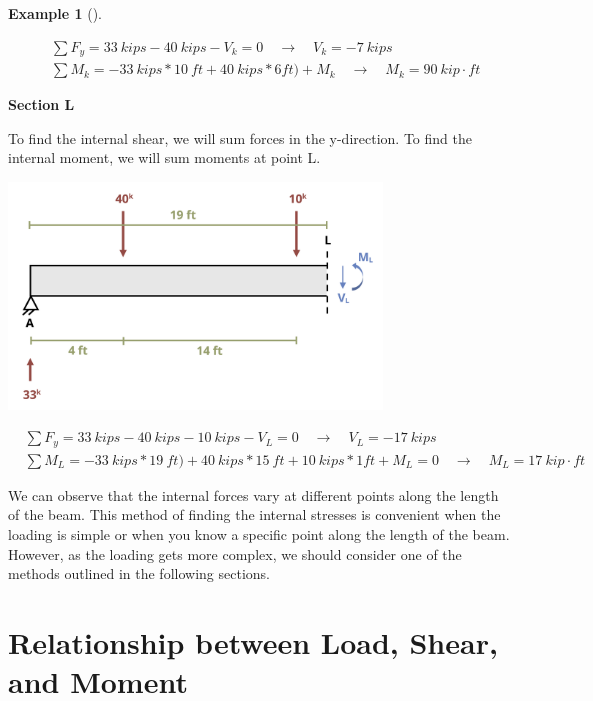 \documentclass[
  letterpaper,
  DIV=11,
  numbers=noendperiod]{scrreprt}
\theoremstyle{definition}
\newtheorem{example}{Example}[chapter]
\theoremstyle{remark}
\begin{document}
\begin{tcolorbox}
\begin{example}[]
\begin{tcolorbox}
\[
\begin{aligned}
&\sum F_y=33{~kips}-40{~kips}-V_k=0 \quad\rightarrow\quad V_k=-7{~kips} \\
&\sum M_k=-33{~kips}*10{~ft}+40{~kips}*6{ft})+M_k \quad\rightarrow\quad M_k=90{~kip}\cdot{ft}
\end{aligned}
\]

\textbf{Section L}

To find the internal shear, we will sum forces in the y-direction. To
find the internal moment, we will sum moments at point L.

\begin{center}
\includegraphics[width=3.90625in,height=\textheight]{images/CH7 PNGs/example 7.1 part 5.png}
\end{center}

\[
\begin{aligned}
&\sum F_y=33{~kips}-40{~kips}-10{~kips}-V_L=0 \quad\rightarrow\quad V_L=-17{~kips} \\
&\sum M_L=-33{~kips}*19{~ft})+40{~kips}*15{~ft}+10{~kips}*1{ft}+M_L=0 \quad\rightarrow\quad
M_L=17{~kip}\cdot{ft}
\end{aligned}
\]

We can observe that the internal forces vary at different points along
the length of the beam. This method of finding the internal stresses is
convenient when the loading is simple or when you know a specific point
along the length of the beam. However, as the loading gets more complex,
we should consider one of the methods outlined in the following
sections.

\end{tcolorbox}

\end{example}

\end{tcolorbox}

\section{Relationship between Load, Shear, and Moment}\label{sec-7.2}
\end{document}

